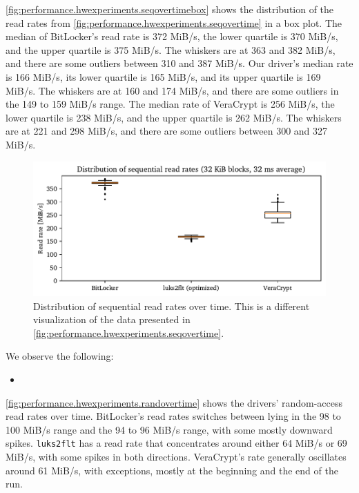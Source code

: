 \autoref{fig:performance.hwexperiments.seqovertimebox} shows the distribution of the read rates from \autoref{fig:performance.hwexperiments.seqovertime} in a box plot. The median of BitLocker's read rate is 372 MiB/s, the lower quartile is 370 MiB/s, and the upper quartile is 375 MiB/s. The whiskers are at 363 and 382 MiB/s, and there are some outliers between 310 and 387 MiB/s. Our driver's median rate is 166 MiB/s, its lower quartile is 165 MiB/s, and its upper quartile is 169 MiB/s. The whiskers are at 160 and 174 MiB/s, and there are some outliers in the 149 to 159 MiB/s range. The median rate of VeraCrypt is 256 MiB/s, the lower quartile is 238 MiB/s, and the upper quartile is 262 MiB/s. The whiskers are at 221 and 298 MiB/s, and there are some outliers between 300 and 327 MiB/s.

\begin{figure}[htb!]
	\center
	\includegraphics[scale=1]{../fig/performance.hwexperiments.seqovertimebox.pdf}
	\caption[
		Distribution of sequential read rates over time
	]{
		Distribution of sequential read rates over time. This is a different visualization of the data presented in \autoref{fig:performance.hwexperiments.seqovertime}.
	}
	\label{fig:performance.hwexperiments.seqovertimebox}
\end{figure}

We observe the following:
\begin{itemize}[beginpenalty=10000]
	\item {}
\end{itemize}

\autoref{fig:performance.hwexperiments.randovertime} shows the drivers' random-access read rates over time. BitLocker's read rates switches between lying in the 98 to 100 MiB/s range and the 94 to 96 MiB/s range, with some mostly downward spikes. \texttt{luks2flt} has a read rate that concentrates around either 64 MiB/s or 69 MiB/s, with some spikes in both directions. VeraCrypt's rate generally oscillates around 61 MiB/s, with exceptions, mostly at the beginning and the end of the run.

